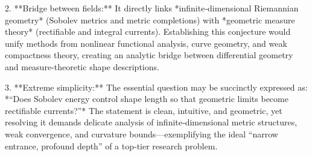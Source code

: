 2. **Bridge between fields:**  It directly links *infinite‑dimensional Riemannian geometry* (Sobolev metrics and metric completions) with *geometric measure theory* (rectifiable and integral currents).  Establishing this conjecture would unify methods from nonlinear functional analysis, curve geometry, and weak compactness theory, creating an analytic bridge between differential geometry and measure‑theoretic shape descriptions.  

3. **Extreme simplicity:**  The essential question may be succinctly expressed as:  
   *“Does Sobolev energy control shape length so that geometric limits become rectifiable currents?”*  
   The statement is clean, intuitive, and geometric, yet resolving it demands delicate analysis of infinite‑dimensional metric structures, weak convergence, and curvature bounds—exemplifying the ideal “narrow entrance, profound depth” of a top‑tier research problem.